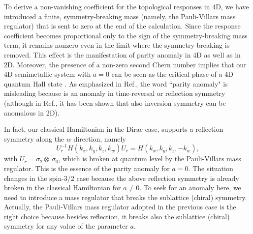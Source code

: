 \documentclass[twocolumn,prl,10pt,superscriptaddress]{revtex4}
\begin{document}
\begin{appendix}
To derive
a non-vanishing coefficient for the topological responses in 4D, we have introduced a finite,
symmetry-breaking mass (namely, the Pauli-Villars mass regulator) that is
sent to zero at the end of the calculation. Since the
response coefficient becomes proportional only to the sign
of the symmetry-breaking mass term, it remains nonzero even
in the limit where the symmetry breaking is removed. This
effect is the manifestation of parity anomaly in 4D as well as in 2D.
Moreover, the presence of a non-zero second Chern number implies that our 4D semimetallic system with $a=0$ can be seen as the critical phase of a 4D quantum Hall state \cite{Zhang}.
As emphasized in Ref.\cite{Witten}, the word ``parity
anomaly" is misleading because is an anomaly
in time-reversal or reflection symmetry (although in Ref.\cite{Ramamurthy}, it has been shown that also inversion symmetry can be anomalous in 2D).

In fact, our classical Hamiltonian in the Dirac case, supports a reflection symmetry along the $w$ direction, namely
\begin{equation}
	U_r^{-1} H (k_x,k_y,k_z,k_w) U_r = H (k_x,k_y,k_z,-k_w),
\end{equation}
with $U_r=\sigma_2\otimes\,\sigma_0$, which is broken at quantum level by the Pauli-Villars mass regulator. This is the essence of the parity anomaly for $a=0$. The situation changes in the spin-3/2 case because the above reflection symmetry is already broken in the classical Hamiltonian for $a\neq 0$.
To seek for an anomaly here, we need to introduce a mass regulator that breaks the sublattice (chiral) symmetry. Actually, the Pauli-Villars mass regulator adopted in the previous case is the right choice because besides reflection, it breaks also the sublattice (chiral) symmetry for any value of the parameter $a$.


\end{appendix}
\end{document}
